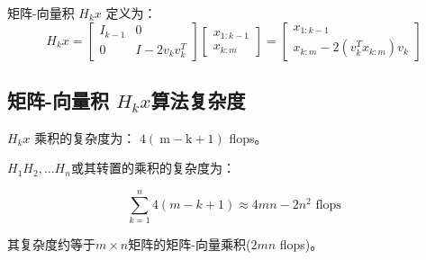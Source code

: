 \begin{definition}
    矩阵-向量积 $ H_{k} x $ 定义为：
$$
H_{k} x=\left[\begin{array}{cc}
I_{k-1} & 0 \\
0 & I-2 v_{k} v_{k}^{T}
\end{array}\right]\left[\begin{array}{c}
x_{1: k-1} \\
x_{k: m}
\end{array}\right]=\left[\begin{array}{c}
x_{1: k-1} \\
x_{k: m}-2\left(v_{k}^{T} x_{k: m}\right) v_{k}
\end{array}\right]
$$
\end{definition}

\subsection{矩阵-向量积 $ H_{k} x $算法复杂度}

$ H_{k} x $ 乘积的复杂度为： $ 4(\mathrm{~m}-\mathrm{k}+1) $ flops。

$H_{1} H_{2}, \ldots H_{n} $或其转置的乘积的复杂度为： 

$$ \sum_{k=1}^{n} 4(m-k+1) \approx 4 m n-2 n^{2}  \text{ flops}$$

其复杂度约等于$m \times n$矩阵的矩阵-向量乘积($2mn$ flops)。 